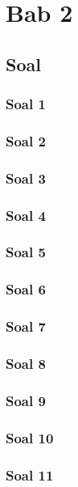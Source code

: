 \chapter{Bab 2}

\section{Soal}

\subsection{Soal 1}

\subsection{Soal 2}

\subsection{Soal 3}

\subsection{Soal 4}

\subsection{Soal 5}

\subsection{Soal 6}

\subsection{Soal 7}

\subsection{Soal 8}

\subsection{Soal 9}

\subsection{Soal 10}

\subsection{Soal 11}
